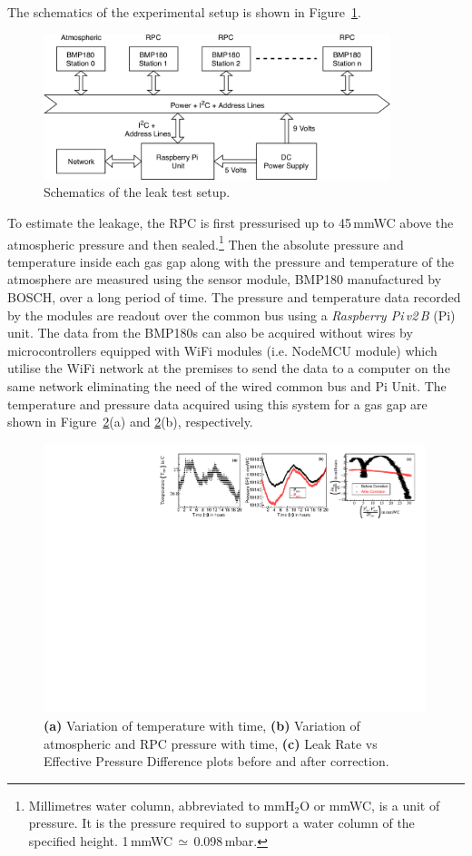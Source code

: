 \documentclass[a4paper,12pt,twoside,openany]{article}
\begin{document}
The schematics of the experimental setup is shown in Figure~\ref{fig:schematics}.
\begin{figure}
  \centering
  \includegraphics[width=0.9\textwidth]{leaktest_setup.png}
  \caption{Schematics of the leak test setup.}
  \label{fig:schematics}
\end{figure}
To estimate the leakage, the RPC is first pressurised up to 45\,mmWC above the atmospheric pressure and then sealed.\footnote{Millimetres water column, abbreviated to mmH$_2$O or mmWC, is a unit of pressure. It is the pressure required to support a water column of the specified height. 1\,mmWC\,$\simeq$\,0.098\,mbar.} Then the absolute pressure and temperature inside each gas gap along with the pressure and temperature of the atmosphere are measured using the sensor module, BMP180 manufactured by BOSCH\cite{bmp180}, over a long period of time. The pressure and temperature data recorded by the modules are readout over the common bus using a \textit{Raspberry Pi\,v2\,B} (Pi) unit\cite{rpi}. The data from the BMP180s can also be acquired without wires by microcontrollers equipped with WiFi modules (i.e. NodeMCU module\cite{nodemcu2015}) which utilise the WiFi network at the premises to send the data to a computer on the same network eliminating the need of the wired common bus and Pi Unit. The temperature and pressure data acquired using this system for a gas gap are shown in Figure~\ref{fig:temp}(a) and \ref{fig:temp}(b), respectively.
\begin{figure}[h!]
  \centering
  \includegraphics[width=0.99\textwidth]{all_57_3x1.pdf}
  \caption{\textbf{(a)} Variation of temperature with time, \textbf{(b)} Variation of atmospheric and RPC pressure with time, \textbf{(c)} Leak Rate vs Effective Pressure Difference plots before and after correction.}
  \label{fig:temp}
\end{figure}
\end{document}
